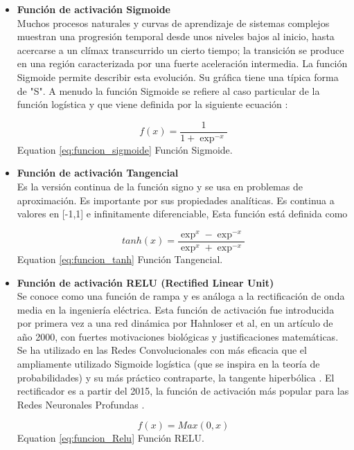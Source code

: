 \begin{itemize}
\item \textbf{Función de activación Sigmoide}\\

Muchos procesos naturales y curvas de aprendizaje de sistemas complejos
muestran una progresión temporal desde unos niveles bajos al inicio, hasta
acercarse a un clímax transcurrido un cierto tiempo; la transición se produce en
una región caracterizada por una fuerte aceleración intermedia. La función
Sigmoide permite describir esta evolución. Su gráfica tiene una típica forma de
"S". A menudo la función Sigmoide se refiere al caso particular de la función
logística y que viene definida por la siguiente ecuación \cite{24fsigmoide}:

\begin{equation}\label{eq:funcion_sigmoide}
f(x) = \frac{1}{1+\exp^{-x}}
\end{equation}
Equation \eqref{eq:funcion_sigmoide} Función Sigmoide.

\item \textbf{Función de activación Tangencial} \\

Es la versión continua de la función signo y se usa en problemas de
aproximación. Es importante por sus propiedades analíticas. Es continua a valores
en [-1,1] e infinitamente diferenciable, Esta función está definida como \cite{25ftangencial}

\begin{equation}\label{eq:funcion_tanh}
tanh(x) = \frac{\exp^x - \exp^{-x}}{\exp^x + \exp^{-x}}
\end{equation}
Equation \eqref{eq:funcion_tanh} Función Tangencial.


\item \textbf{Función de activación RELU (Rectified Linear Unit)} \\

Se conoce como una función de rampa y es análoga a la rectificación de
onda media en la ingeniería eléctrica. Esta función de activación fue introducida
por primera vez a una red dinámica por Hahnloser et al, en un artículo de año
2000, con fuertes motivaciones biológicas y justificaciones matemáticas. Se ha
utilizado en las Redes Convolucionales con más eficacia que el ampliamente
utilizado Sigmoide logística (que se inspira en la teoría de probabilidades) y su
más práctico contraparte, la tangente hiperbólica . El rectificador es a partir del
2015, la función de activación más popular para las Redes Neuronales Profundas 
\cite{26fRelu}.

\begin{equation}\label{eq:funcion_Relu}
f(x)=Max(0,x)
\end{equation}
Equation \eqref{eq:funcion_Relu} Función RELU.

\end{itemize}
